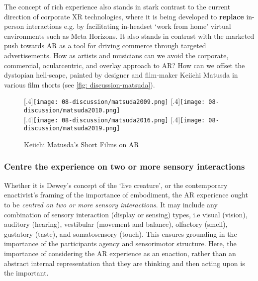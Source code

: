 The concept of rich experience also stands in stark contrast to the current direction of corporate XR technologies, where it is being developed to \textbf{replace} in-person interactions e.g. by facilitating in-headset `work from home' virtual environments such as Meta Horizons. It also stands in contrast with the marketed push towards AR as a tool for driving commerce through targeted advertisements. How as artists and musicians can we avoid the corporate, commercial, ocularcentric, and overlay approach to AR? How can we offset the dystopian hell-scape, painted by designer and film-maker Keiichi Matusda in various film shorts (see \autoref{fig: discussion-matsuda}).

\begin{figure}
    \centering
    [.4\linewidth]{\texttt{[image: 08-discussion/matsuda2009.png]}}
    [.4\linewidth]{\texttt{[image: 08-discussion/matsuda2010.png]}} \\
    \vspace{0.5cm}
    [.4\linewidth]{\texttt{[image: 08-discussion/matsuda2016.png]}}
    [.4\linewidth]{\texttt{[image: 08-discussion/matsuda2019.png]}}
    \caption{Keiichi Matusda's Short Films on AR}
    \label{fig: discussion-matsuda}
\end{figure}

\subsubsection{Centre the experience on two or more sensory interactions}
Whether it is Dewey's concept of the `live creature', or the contemporary enactivist's framing of the importance of embodiment, the AR experience ought to be \textit{centred on two or more sensory interactions}. It may include any combination of sensory interaction (display or sensing) types, i.e visual (vision), auditory (hearing), vestibular (movement and balance), olfactory (smell), gustatory (taste), and somatosensory (touch). This ensures grounding in the importance of the participants agency and sensorimotor structure. Here, the importance of considering the AR experience as an enaction, rather than an abstract internal representation that they are thinking and then acting upon is the important.

